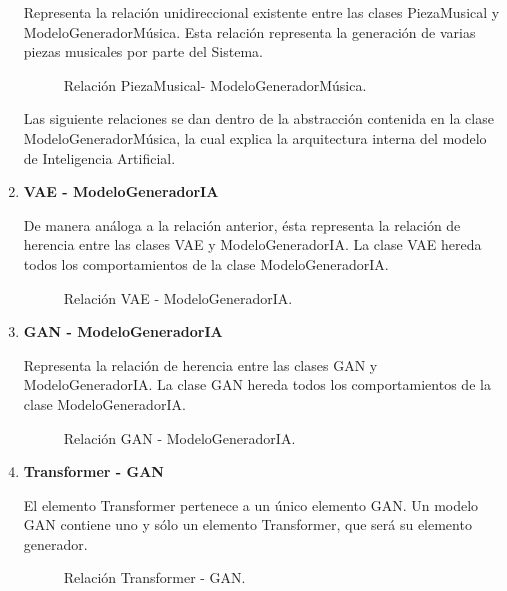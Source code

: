 \begin{enumerate}
  Representa la relación unidireccional existente entre las clases PiezaMusical y ModeloGeneradorMúsica. Esta relación representa la generación de varias piezas musicales por parte del Sistema.

  \begin{figure}[H]
    \centering
    
    \caption{Relación PiezaMusical- ModeloGeneradorMúsica.}
  \end{figure}

  Las siguiente relaciones se dan dentro de la abstracción contenida en la clase ModeloGeneradorMúsica, la cual explica la arquitectura interna del modelo de Inteligencia Artificial.

  \item \textbf{VAE - ModeloGeneradorIA}

  De manera análoga a la relación anterior, ésta representa la relación de herencia entre las clases VAE y ModeloGeneradorIA. La clase VAE hereda todos los comportamientos de la clase ModeloGeneradorIA.

  \begin{figure}[H]
    \centering
    
    \caption{Relación VAE - ModeloGeneradorIA.}
  \end{figure}

  \item \textbf{GAN - ModeloGeneradorIA}

  Representa la relación de herencia entre las clases GAN y ModeloGeneradorIA. La clase GAN hereda todos los comportamientos de la clase ModeloGeneradorIA.

  \begin{figure}[H]
    \centering
    
    \caption{Relación GAN - ModeloGeneradorIA.}
  \end{figure}

  \item \textbf{Transformer - GAN}

  El elemento Transformer pertenece a un único elemento GAN. Un modelo GAN contiene uno y sólo un elemento Transformer, que será su elemento generador.

  \begin{figure}[H]
    \centering
    
    \caption{Relación Transformer - GAN.}
  \end{figure}


\end{enumerate}
